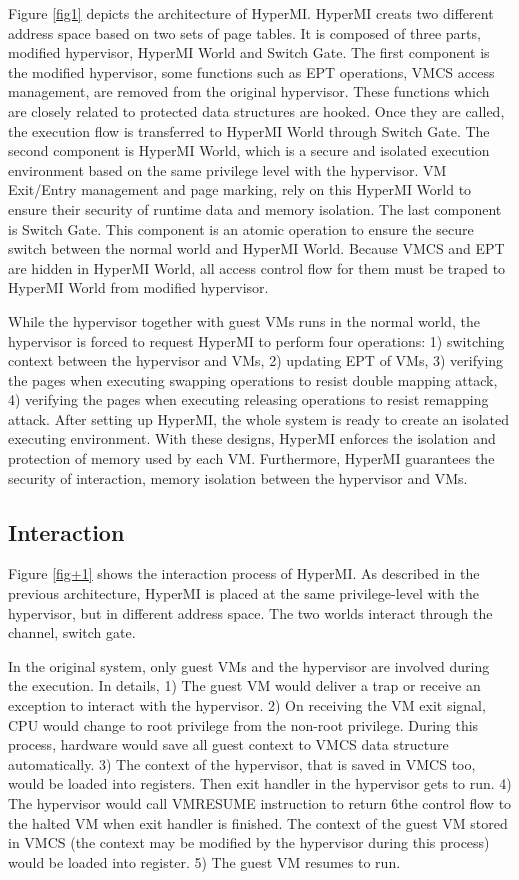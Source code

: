 \documentclass[conference]{IEEEtran}
\begin{document}
Figure \ref{fig1} depicts the architecture of HyperMI. HyperMI creats two different address space based on two sets of page tables. It is composed of three parts, modified hypervisor, HyperMI World and Switch Gate. The first component is the modified hypervisor, some functions such as EPT operations, VMCS access management, are removed from the original hypervisor. These functions which are closely related to protected data structures are hooked. Once they are called, the execution flow is transferred to HyperMI World through Switch Gate. The second component is HyperMI World, which is a secure and isolated execution environment based on the same privilege level with the hypervisor. VM Exit/Entry management and page marking, rely on this HyperMI World to ensure their security of runtime data and memory isolation. The last component is Switch Gate. This component is an atomic operation to ensure the secure switch between the normal world and HyperMI World. Because VMCS and EPT are hidden in HyperMI World, all access control flow for them must be traped to HyperMI World from modified hypervisor.

While the hypervisor together with guest VMs runs in the normal world, the hypervisor is forced to request HyperMI to perform four operations: 1) switching context between the hypervisor and VMs, 2) updating EPT of VMs, 3) verifying the pages when executing swapping operations to resist double mapping attack, 4) verifying the pages when executing releasing operations to resist remapping attack. After setting up HyperMI, the whole system is ready to create an isolated executing environment. With these designs, HyperMI enforces the isolation and protection of memory used by each VM. Furthermore, HyperMI guarantees the security of interaction, memory isolation between the hypervisor and VMs.


\iffalse
\subsection{Interaction} \label{IN}


Figure \ref{fig+1} shows the interaction process of HyperMI. 
As described in the previous architecture, HyperMI is placed at the same privilege-level with the hypervisor, but in different address space. The two worlds interact through the channel, switch gate.


In the original system, only guest VMs and the hypervisor are involved during the execution. In details, 1) The guest VM would deliver a trap or receive an exception to interact with the hypervisor. 2) On receiving the VM exit signal, CPU would change to root privilege from the non-root privilege. During this process, hardware would save all guest context to VMCS data structure automatically. 3) The context of the hypervisor, that is saved in VMCS too, would be loaded into registers. Then exit handler in the hypervisor gets to run. 4) The hypervisor would call VMRESUME instruction to return 6the control flow to the halted VM when exit handler is finished. The context of the guest VM stored in VMCS (the context may be modified by the hypervisor during this process) would be loaded into register. 5) The guest VM resumes to run.
\end{document}
